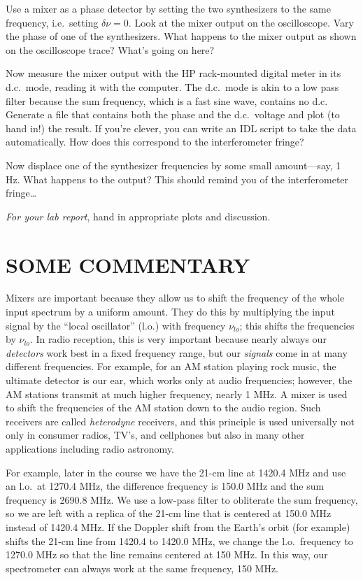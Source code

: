 \documentclass[11pt,preprint]{aastex}
\begin{document}
        Use a mixer as a phase detector by setting the two synthesizers
to the same frequency, i.e.\ setting $\delta \nu = 0$.  Look at the
mixer output on the oscilloscope.  Vary the phase of one of the
synthesizers.  What happens to the mixer output as shown on the
oscilloscope trace? What's going on here?

Now measure the mixer output with the HP rack-mounted digital meter in
its d.c.\ mode, reading it with the computer.  The d.c.\ mode is akin to
a low pass filter because the sum frequency, which is a fast sine
wave, contains no d.c.  Generate a file that contains both the phase and
the d.c.\ voltage and plot (to hand in!) the result.  If you're clever,
you can write an IDL script to take the data automatically.  How does
this correspond to the interferometer fringe?

        Now displace one of the synthesizer frequencies by some small
amount---say, 1 Hz. What happens to the output? This should remind you
of the interferometer fringe\dots

        {\it For your lab report}, hand in appropriate plots and discussion.


\section {SOME COMMENTARY}

Mixers are important because they allow us to shift the
frequency of the whole input spectrum by a uniform amount.  They do this
by multiplying the input signal by the ``local oscillator'' (l.o.) with
frequency $\nu_{lo}$; this shifts the frequencies by $\nu_{lo}$.  In radio
reception, this is very important because nearly always our {\it
detectors} work best in a fixed frequency range, but our {\it signals}
come in at many different frequencies.  For example, for an AM station
playing rock music, the ultimate detector is our ear, which works only
at audio frequencies; however, the AM stations transmit at much higher
frequency, nearly 1 MHz.  A mixer is used to shift the frequencies of
the AM station down to the audio region.  Such receivers are called {\it
heterodyne} receivers, and this principle is used universally not only
in consumer radios, TV's, and cellphones but also in many other
applications including radio astronomy.

        For example, later in the course we have the 21-cm line at
1420.4 MHz and use an l.o.\ at 1270.4 MHz, the difference frequency is
150.0 MHz and the sum frequency is 2690.8 MHz.  We use a low-pass filter
to obliterate the sum frequency, so we are left with a replica of the
21-cm line that is centered at 150.0 MHz instead of 1420.4 MHz.  If the
Doppler shift from the Earth's orbit (for example) shifts the 21-cm line
from 1420.4 to 1420.0 MHz, we change the l.o.\ frequency to 1270.0 MHz
so that the line remains centered at 150 MHz.  In this way, our
spectrometer can always work at the same frequency, 150 MHz.
\end{document}
